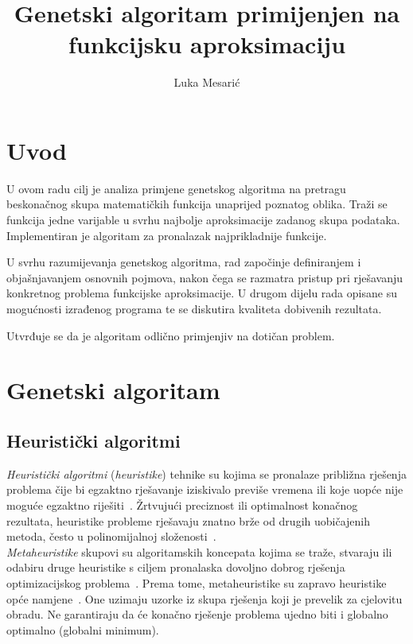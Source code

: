 \documentclass[times, utf8, seminar, numeric]{fer}
\begin{document}
\nocite{*}

\title{Genetski algoritam primijenjen na funkcijsku aproksimaciju}

\author{Luka Mesarić}


\maketitle

\tableofcontents

\chapter{Uvod}

U ovom radu cilj je analiza primjene genetskog algoritma na pretragu beskonačnog skupa matematičkih funkcija unaprijed poznatog oblika.
Traži se funkcija jedne varijable u svrhu najbolje aproksimacije zadanog skupa podataka.
Implementiran je algoritam za pronalazak najprikladnije funkcije.

U svrhu razumijevanja genetskog algoritma, rad započinje definiranjem i objašnjavanjem osnovnih pojmova, nakon čega se razmatra pristup pri rješavanju konkretnog problema funkcijske aproksimacije.
U drugom dijelu rada opisane su mogućnosti izrađenog programa te se diskutira kvaliteta dobivenih rezultata.

Utvrđuje se da je algoritam odlično primjenjiv na dotičan problem.


\chapter{Genetski algoritam}

\section{Heuristički algoritmi}

\textit{Heuristički algoritmi} (\textit{heuristike}) tehnike su kojima se pronalaze približna rješenja problema čije bi egzaktno rješavanje iziskivalo previše vremena ili koje uopće nije moguće egzaktno riješiti~\cite{Cupic}.
Žrtvujući preciznost ili optimalnost konačnog rezultata, heuristike probleme rješavaju znatno brže od drugih uobičajenih metoda, često u polinomijalnoj složenosti~\cite{WikiHeuristic}.\\

\textit{Metaheuristike} skupovi su algoritamskih koncepata kojima se traže, stvaraju ili odabiru druge heuristike s ciljem pronalaska dovoljno dobrog rješenja optimizacijskog problema~\cite{WikiMetaheuristic}.
Prema tome, metaheuristike su zapravo heuristike opće namjene~\cite{Cupic}.
One uzimaju uzorke iz skupa rješenja koji je prevelik za cjelovitu obradu.
Ne garantiraju da će konačno rješenje problema ujedno biti i globalno optimalno (globalni minimum).
\end{document}
